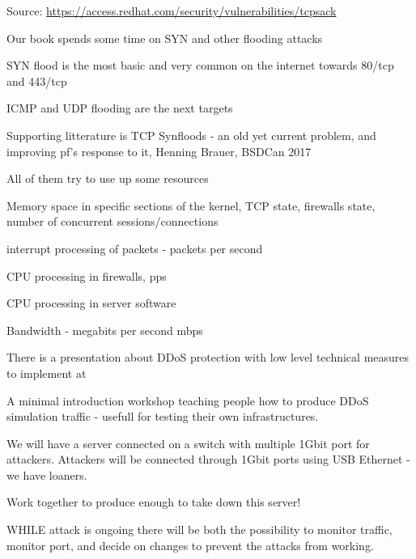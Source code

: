 \documentclass[Screen16to9,17pt]{foils}
\begin{document}
Source: {\footnotesize\url{https://access.redhat.com/security/vulnerabilities/tcpsack}}



\begin{list2}
\item Our book spends some time on SYN and other flooding attacks
\item SYN flood is the most basic and very common on the internet towards 80/tcp and 443/tcp
\item ICMP and UDP flooding are the next targets
\item Supporting litterature is TCP Synfloods - an old yet current problem, and improving pf's response to it, Henning Brauer, BSDCan 2017
\item All of them try to use up some resources
\begin{list2}
\item Memory space in specific sections of the kernel, TCP state, firewalls state, number of concurrent sessions/connections
\item interrupt processing of packets - packets per second
\item CPU processing in firewalls, pps
\item CPU processing in server software
\item Bandwidth - megabits per second mbps
\end{list2}
\end{list2}

There is a presentation about DDoS protection with low level technical measures to implement at\\
{\footnotesize {}}





A minimal introduction workshop teaching people how to produce DDoS simulation traffic - usefull for testing their own infrastructures.

We will have a server connected on a switch with multiple 1Gbit port for attackers. Attackers will be connected through 1Gbit ports using USB Ethernet - we have loaners.

Work together to produce enough to take down this server!

WHILE attack is ongoing there will be both the possibility to monitor traffic, monitor port, and decide on changes to prevent the attacks from working.
\end{document}
